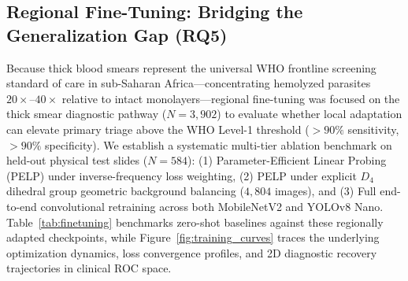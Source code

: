\documentclass[a4paper,11pt]{article}
\begin{document}
\subsection{Regional Fine-Tuning: Bridging the Generalization Gap (RQ5)}
Because thick blood smears represent the universal WHO frontline screening standard of care in sub-Saharan Africa---concentrating hemolyzed parasites $20\times\text{--}40\times$ relative to intact monolayers---regional fine-tuning was focused on the thick smear diagnostic pathway ($N = 3,902$) to evaluate whether local adaptation can elevate primary triage above the WHO Level-1 threshold ($>90\%$ sensitivity, $>90\%$ specificity). We establish a systematic multi-tier ablation benchmark on held-out physical test slides ($N = 584$): (1) Parameter-Efficient Linear Probing (PELP) under inverse-frequency loss weighting, (2) PELP under explicit $D_4$ dihedral group geometric background balancing ($4,804$ images), and (3) Full end-to-end convolutional retraining across both MobileNetV2 and YOLOv8 Nano. Table~\ref{tab:finetuning} benchmarks zero-shot baselines against these regionally adapted checkpoints, while Figure~\ref{fig:training_curves} traces the underlying optimization dynamics, loss convergence profiles, and 2D diagnostic recovery trajectories in clinical ROC space.
\end{document}
